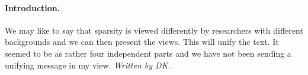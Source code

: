 \paragraph*{Introduction.}

We may like to say that sparsity is viewed differently by researchers with different backgrounds and
we can then present the views. This will unify the text. It seemed to be as rather four independent parts and
we have not been sending a unifying message in my view. \emph{Written by DK.}
